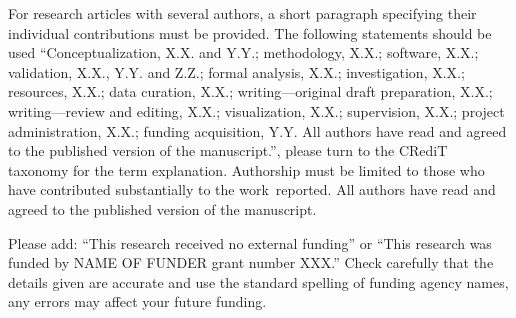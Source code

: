 \documentclass[default]{subfiles}
\begin{document}
{\begin{authorcontributions}
  For research articles with several authors, a short paragraph specifying their individual contributions must be provided. The following statements should be used ``Conceptualization, X.X. and Y.Y.; methodology, X.X.; software, X.X.; validation, X.X., Y.Y. and Z.Z.; formal analysis, X.X.; investigation, X.X.; resources, X.X.; data curation, X.X.; writing---original draft preparation, X.X.; writing---review and editing, X.X.; visualization, X.X.; supervision, X.X.; project administration, X.X.; funding acquisition, Y.Y. All authors have read and agreed to the published version of the manuscript.'', please turn to the CRediT taxonomy for the term explanation. Authorship must be limited to those who have contributed substantially to the work~reported.
  All authors have read and agreed to the published version of the manuscript.
\end{authorcontributions}

\begin{funding}
  Please add: ``This research received no external funding'' or ``This research was funded by NAME OF FUNDER grant number XXX.'' Check carefully that the details given are accurate and use the standard spelling of funding agency names, any errors may affect your future funding.
\end{funding}

}
\end{document}
